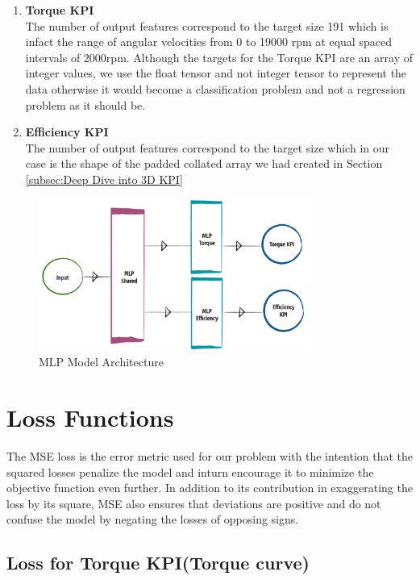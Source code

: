 \documentclass{report} %
\begin{document}
\begin{enumerate}
    \item \textbf{Torque \ac{KPI}} \\
    The number of output features correspond to the target size 191 which is infact the range of angular velocities from 0 to 19000 rpm at equal spaced intervals of 2000rpm.
    Although the targets for the Torque \ac{KPI} are an array of integer values, we use the float tensor and not integer tensor to represent the data otherwise 
    it would become a classification problem and not a regression problem as it should be. 
    \item \textbf{Efficiency \ac{KPI}} \\
    The number of output features correspond to the target size which in our case is the shape of the padded collated array we had created in Section \ref{subsec:Deep Dive into 3D KPI}
\end{enumerate}

\begin{figure}[H]
    \centering
    \includegraphics[width=0.8\textwidth]{./ReportImages/mlp_architecture.png} 
    \caption{MLP Model Architecture}
    \label{fig:MLP Model Architecture}
\end{figure}

\section{Loss Functions}\label{sec:Loss Functions}
The \ac{MSE} loss is the error metric used for our problem with the intention that the squared losses penalize the model and inturn encourage it to 
minimize the objective function even further. In addition to its contribution in exaggerating the loss by its square, \ac{MSE} also ensures that deviations are 
positive and do not confuse the model by negating the losses of opposing signs. 
\subsection{Loss for Torque \ac{KPI}(Torque curve)}\label{sec:Loss for 2D KPI}
\end{document}
